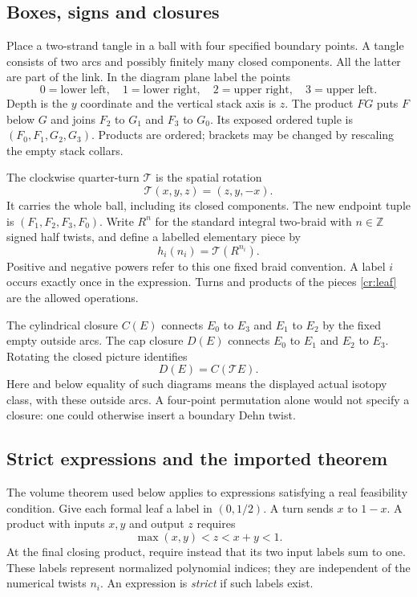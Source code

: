 \documentclass[11pt]{article}
\numberwithin{equation}{section}
\theoremstyle{definition}\newtheorem{definition}[theorem]{Definition}
\theoremstyle{remark}\newtheorem{remark}[theorem]{Remark}
\newcommand{\Turn}{\mathcal T}
\begin{document}
\subsection{Boxes, signs and closures}

Place a two-strand tangle in a ball with four specified boundary points. A tangle consists of two arcs and possibly finitely many closed components. All the latter are part of the link. In the diagram plane label the points
\[
 0=\text{lower left},\quad1=\text{lower right},\quad
 2=\text{upper right},\quad3=\text{upper left}.
\]
Depth is the $y$ coordinate and the vertical stack axis is $z$. The product $FG$ puts $F$ below $G$ and joins $F_2$ to $G_1$ and $F_3$ to $G_0$. Its exposed ordered tuple is $(F_0,F_1,G_2,G_3)$. Products are ordered; brackets may be changed by rescaling the empty stack collars.

The clockwise quarter-turn $\Turn$ is the spatial rotation
\[
             \Turn(x,y,z)=(z,y,-x).
\]
It carries the whole ball, including its closed components. The new endpoint tuple is $(F_1,F_2,F_3,F_0)$. Write $R^n$ for the standard integral two-braid with $n\in\mathbb Z$ signed half twists, and define a labelled elementary piece by
\begin{equation}\label{cr:leaf}
                    h_i(n_i)=\Turn(R^{n_i}).
\end{equation}
Positive and negative powers refer to this one fixed braid convention. A label $i$ occurs exactly once in the expression. Turns and products of the pieces \eqref{cr:leaf} are the allowed operations.

The cylindrical closure $C(E)$ connects $E_0$ to $E_3$ and $E_1$ to $E_2$ by the fixed empty outside arcs. The cap closure $D(E)$ connects $E_0$ to $E_1$ and $E_2$ to $E_3$. Rotating the closed picture identifies
\begin{equation}\label{cr:two-closures}
                         D(E)=C(\Turn E).
\end{equation}
Here and below equality of such diagrams means the displayed actual isotopy class, with these outside arcs. A four-point permutation alone would not specify a closure: one could otherwise insert a boundary Dehn twist.

\subsection{Strict expressions and the imported theorem}

The volume theorem used below applies to expressions satisfying a
real feasibility condition. Give each formal leaf a label in $(0,1/2)$.
A turn sends $x$ to $1-x$. A product with inputs $x,y$ and output $z$
requires
\[
                    \max(x,y)<z<x+y<1.
\]
At the final closing product, require instead that its two input labels
sum to one. These labels represent normalized polynomial indices;
they are independent of the numerical twists $n_i$.
An expression is \emph{strict} if such labels exist.
\end{document}
